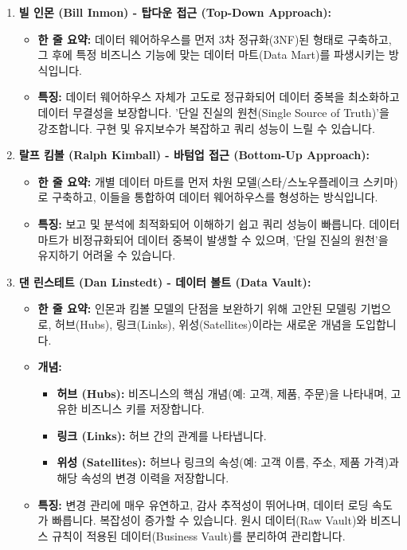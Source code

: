 \documentclass[11pt,a4paper]{article}
\theoremstyle{definition}
\begin{document}
\begin{enumerate}
    \item \textbf{빌 인몬 (Bill Inmon) - 탑다운 접근 (Top-Down Approach):}
    \begin{itemize}
        \item \textbf{한 줄 요약:} 데이터 웨어하우스를 먼저 3차 정규화(3NF)된 형태로 구축하고, 그 후에 특정 비즈니스 기능에 맞는 데이터 마트(Data Mart)를 파생시키는 방식입니다.
        \item \textbf{특징:} 데이터 웨어하우스 자체가 고도로 정규화되어 데이터 중복을 최소화하고 데이터 무결성을 보장합니다. '단일 진실의 원천(Single Source of Truth)'을 강조합니다. 구현 및 유지보수가 복잡하고 쿼리 성능이 느릴 수 있습니다.
    \end{itemize}

    \item \textbf{랄프 킴볼 (Ralph Kimball) - 바텀업 접근 (Bottom-Up Approach):}
    \begin{itemize}
        \item \textbf{한 줄 요약:} 개별 데이터 마트를 먼저 차원 모델(스타/스노우플레이크 스키마)로 구축하고, 이들을 통합하여 데이터 웨어하우스를 형성하는 방식입니다.
        \item \textbf{특징:} 보고 및 분석에 최적화되어 이해하기 쉽고 쿼리 성능이 빠릅니다. 데이터 마트가 비정규화되어 데이터 중복이 발생할 수 있으며, '단일 진실의 원천'을 유지하기 어려울 수 있습니다.
    \end{itemize}

    \item \textbf{댄 린스테트 (Dan Linstedt) - 데이터 볼트 (Data Vault):}
    \begin{itemize}
        \item \textbf{한 줄 요약:} 인몬과 킴볼 모델의 단점을 보완하기 위해 고안된 모델링 기법으로, 허브(Hubs), 링크(Links), 위성(Satellites)이라는 새로운 개념을 도입합니다.
        \item \textbf{개념:}
        \begin{itemize}
            \item \textbf{허브 (Hubs):} 비즈니스의 핵심 개념(예: 고객, 제품, 주문)을 나타내며, 고유한 비즈니스 키를 저장합니다.
            \item \textbf{링크 (Links):} 허브 간의 관계를 나타냅니다.
            \item \textbf{위성 (Satellites):} 허브나 링크의 속성(예: 고객 이름, 주소, 제품 가격)과 해당 속성의 변경 이력을 저장합니다.
        \end{itemize}
        \item \textbf{특징:} 변경 관리에 매우 유연하고, 감사 추적성이 뛰어나며, 데이터 로딩 속도가 빠릅니다. 복잡성이 증가할 수 있습니다. 원시 데이터(Raw Vault)와 비즈니스 규칙이 적용된 데이터(Business Vault)를 분리하여 관리합니다.
    \end{itemize}
\end{enumerate}
\end{document}
